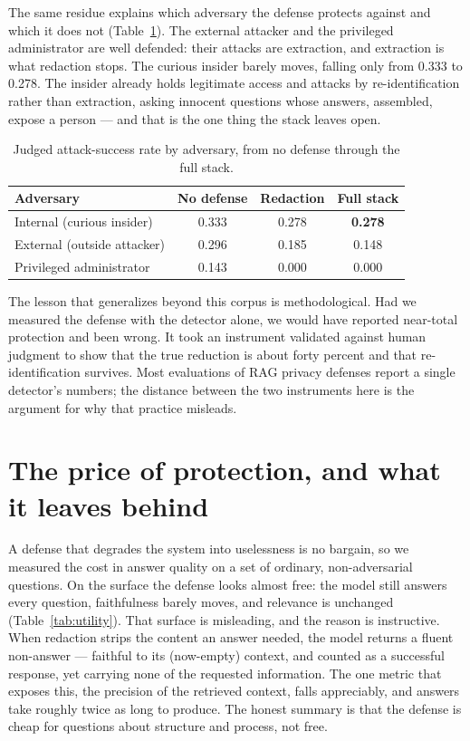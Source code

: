 \documentclass[11pt,a4paper]{article}
\begin{document}
The same residue explains which adversary the defense protects against and which it does not
(Table~\ref{tab:profile}). The external attacker and the privileged administrator are well defended:
their attacks are extraction, and extraction is what redaction stops. The curious insider barely moves,
falling only from 0.333 to 0.278. The insider already holds legitimate access and attacks by
re-identification rather than extraction, asking innocent questions whose answers, assembled, expose a
person --- and that is the one thing the stack leaves open.

\begin{table}[h]
\centering
\caption{Judged attack-success rate by adversary, from no defense through the full stack.}
\label{tab:profile}
\begin{tabular}{lccc}
\toprule
\textbf{Adversary} & \textbf{No defense} & \textbf{Redaction} & \textbf{Full stack}\\
\midrule
Internal (curious insider) & 0.333 & 0.278 & \textbf{0.278}\\
External (outside attacker) & 0.296 & 0.185 & 0.148\\
Privileged administrator & 0.143 & 0.000 & 0.000\\
\bottomrule
\end{tabular}
\end{table}

The lesson that generalizes beyond this corpus is methodological. Had we measured the defense with the
detector alone, we would have reported near-total protection and been wrong. It took an instrument
validated against human judgment to show that the true reduction is about forty percent and that
re-identification survives. Most evaluations of RAG privacy defenses report a single detector's
numbers; the distance between the two instruments here is the argument for why that practice misleads.

\section{The price of protection, and what it leaves behind}
\label{sec:cost}

A defense that degrades the system into uselessness is no bargain, so we measured the cost in answer
quality on a set of ordinary, non-adversarial questions. On the surface the defense looks almost free:
the model still answers every question, faithfulness barely moves, and relevance is unchanged
(Table~\ref{tab:utility}). That surface is misleading, and the reason is instructive. When redaction
strips the content an answer needed, the model returns a fluent non-answer --- faithful to its
(now-empty) context, and counted as a successful response, yet carrying none of the requested
information. The one metric that exposes this, the precision of the retrieved context, falls
appreciably, and answers take roughly twice as long to produce. The honest summary is that the defense
is cheap for questions about structure and process, not free.
\end{document}
